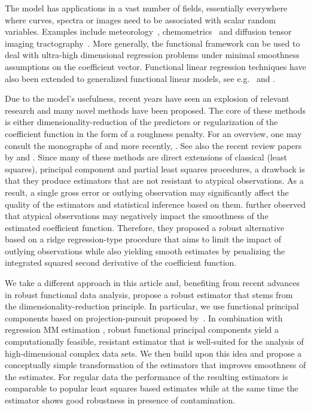 \documentclass[11pt]{article}
\begin{document}
The model has applications in a vast number of fields, essentially everywhere where curves, spectra or images need to be associated with scalar random variables. Examples include meteorology~\citep{ramsay2006functional},  chemometrics~\citep{ferraty2006nonparametric} and diffusion tensor imaging tractography~\citep{goldsmith2014estimator}.  More generally, the functional framework can be used to deal with ultra-high dimensional regression problems under minimal smoothness assumptions on the coefficient vector. Functional linear regression techniques have also been extended to generalized functional linear models, see e.g.\ \citep{muller2005generalized} and \citep{goldsmith2011penalized}.

Due to the model's usefulness, recent years have seen an explosion of relevant research and many novel methods have been proposed. The core of these methods is either dimensionality-reduction of the predictors or regularization of the coefficient function in the form of a roughness penalty. For an overview, one may consult the monographs of \citet{ramsay2006functional, horvath2012inference,hsing2015theoretical} and more recently, \citet{kokoszka2017introduction}. See also the recent review papers by \citet{febrero2015functional} and \citet{reiss2017methods}. 
Since many of these methods are direct extensions of classical (least squares), principal component and partial least squares procedures, a drawback is that they produce estimators that are not resistant to atypical observations. As a result, a single gross error or outlying observation may significantly affect the quality of the estimators and statistical inference based on them.  \citet{maronna2013robust} further observed that atypical observations may negatively impact the smoothness of the estimated coefficient function. Therefore, they proposed a robust alternative based on  a ridge regression-type procedure that aims to limit the impact of outlying observations while also yielding smooth estimates by penalizing the integrated squared second derivative of the coefficient function.

We take a different approach in this article and, benefiting from recent advances in robust functional data analysis, propose a robust estimator that stems from the dimensionality-reduction principle. In particular, we use functional principal components based on projection-pursuit proposed by~\citet{bali2011robust}. In combination with regression MM estimation \citep{yohai1987high}, robust functional principal components yield a computationally feasible, resistant estimator that is well-suited for the analysis of high-dimensional complex data sets. We then build upon this idea and propose a conceptually simple transformation of the estimators that improves smoothness of the estimates. For regular data the performance of the resulting estimators is comparable to popular least squares based estimates while at the same time the estimator shows good robustness in presence of contamination. 
\end{document}
